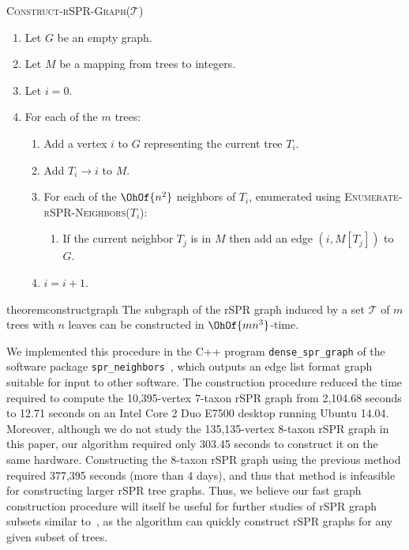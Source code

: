 \documentclass[11pt]{amsart}
\newtheorem{theorem}{Theorem}[section]
\begin{document}
\textsc{Construct-rSPR-Graph($\mathcal{T}$)}
\begin{enumerate}[label={\arabic*}.]
	\item Let $G$ be an empty graph.
	\item Let $M$ be a mapping from trees to integers.
	\item Let $i = 0$.
	\item For each of the $m$ trees: \vspace{-0.2em}
		\begin{enumerate}
			\item Add a vertex $i$ to $G$ representing the current tree $T_i$.
			\item Add $T_i \rightarrow i$ to $M$.
			\item For each of the $\OhOf{n^2}$ neighbors of $T_i$, enumerated using \textsc{Enumerate-rSPR-Neighbors($T_i$)}: \vspace{-1.4em}
				\begin{enumerate}
					\item If the current neighbor $T_j$ is in $M$ then add an edge $(i,M[T_j])$ to $G$.
				\end{enumerate}
		\item $i = i + 1$.
		\end{enumerate}
\end{enumerate}

\begin{restatable}{theorem}{constructgraph}
	\label{thm:construct_graph}
	The subgraph of the rSPR graph induced by a set $\mathcal{T}$ of $m$ trees with $n$ leaves can be constructed in $\OhOf{mn^3}$-time.
\end{restatable}

We implemented this procedure in the C++ program \texttt{dense\_spr\_graph} of the software package \texttt{spr\_neighbors}~\cite{spr_neighbors}, which outputs an edge list format graph suitable for input to other software.
The construction procedure reduced the time required to compute the 10,395-vertex 7-taxon rSPR graph from 2,104.68 seconds to 12.71 seconds on an Intel Core 2 Duo E7500 desktop running Ubuntu 14.04.
Moreover, although we do not study the 135,135-vertex 8-taxon rSPR graph in this paper, our algorithm required only 303.45 seconds to construct it on the same hardware.
Constructing the 8-taxon rSPR graph using the previous method required 377,395 seconds (more than 4 days), and thus that method is infeasible for constructing larger rSPR tree graphs.
Thus, we believe our fast graph construction procedure will itself be useful for further studies of rSPR graph subsets similar to~\cite{Whidden2015-yi}, as the algorithm can quickly construct rSPR graphs for any given subset of trees.
\end{document}
